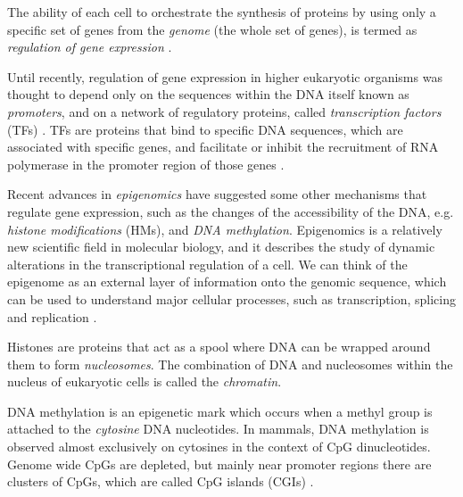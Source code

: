 The ability of each cell to orchestrate the synthesis of proteins by using only a specific set of genes from the \emph{genome} (\ie the whole set of genes), is termed as \emph{regulation of gene expression} \citep{Jasny2001}.

Until recently, regulation of gene expression in higher eukaryotic organisms was thought to depend only on the sequences within the DNA itself known as \emph{promoters}, and on a network of regulatory proteins, called \emph{transcription factors} (TFs) \citep{Jasny2001}. TFs are proteins that bind to specific DNA sequences, which are associated with specific genes, and facilitate or inhibit the recruitment of RNA polymerase in the promoter region of those genes \citep{Ptashne2002}. 

Recent advances in \emph{epigenomics} have suggested some other mechanisms that regulate gene expression, such as the changes of the accessibility of the DNA, e.g. \emph{histone modifications} (HMs), and \emph{DNA methylation}. Epigenomics is a relatively new scientific field in molecular biology, and it describes the study of dynamic alterations in the transcriptional regulation of a cell. We can think of the epigenome as an external layer of information onto the genomic sequence, which can be used to understand major cellular processes, such as transcription, splicing and replication \citep{Furey2012}.

Histones are proteins that act as a spool where DNA can be wrapped around them to form \emph{nucleosomes}. The combination of DNA and nucleosomes within the nucleus of eukaryotic cells is called the \emph{chromatin}. 

DNA methylation is an epigenetic mark which occurs when a methyl group is attached to the \emph{cytosine} DNA nucleotides. In mammals, DNA methylation is observed almost exclusively on cytosines in the context of CpG dinucleotides. Genome wide CpGs are depleted, but mainly near promoter regions there are clusters of CpGs, which are called CpG islands (CGIs) \citep{Bird2002}. 


